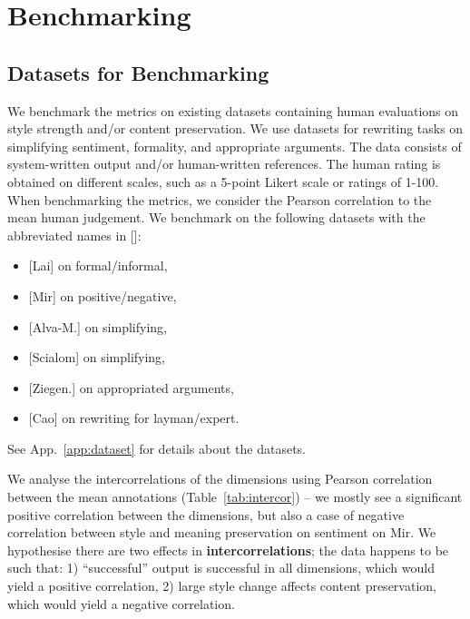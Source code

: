 \section{Benchmarking}
\subsection{Datasets for Benchmarking}
\label{sec:dataset}
We benchmark the metrics on existing datasets containing human evaluations on style strength and/or content preservation. We use datasets for rewriting tasks on simplifying sentiment, formality, and appropriate arguments. The data consists of system-written output and/or human-written references. The human rating is obtained on different scales, such as a 5-point Likert scale or ratings of 1-100. When benchmarking the metrics, we consider the Pearson correlation to the mean human judgement. We benchmark on the following datasets with the abbreviated names in []: 
\begin{itemize}[noitemsep]
    \item \citet{lai-etal-2022-human} [Lai] on formal/informal,
    \item \citet{mir-etal-2019-evaluating} [Mir] on positive/negative,
    \item \citet{alva-manchego-etal-2020-asset} [Alva-M.] on simplifying, 
    \item \citet{scialom-etal-2021-questeval} [Scialom] on simplifying,
    \item \citet{ziegenbein-etal-2024-llm} [Ziegen.] on appropriated arguments,
    \item \citet{cao-etal-2020-expertise} [Cao] on rewriting for layman/expert.
\end{itemize}
See App.~\ref{app:dataset} for details about the datasets.


We analyse the intercorrelations of the dimensions using Pearson correlation between the mean annotations (Table~\ref{tab:intercor}) -- we mostly see a significant positive correlation between the dimensions, but also a case of negative correlation between style and meaning preservation on sentiment on Mir. We hypothesise there are two effects in \textbf{intercorrelations}; the data happens to be such that: 1) ``successful'' output is successful in all dimensions, which would yield a positive correlation, 2) large style change affects content preservation, which would yield a negative correlation.

